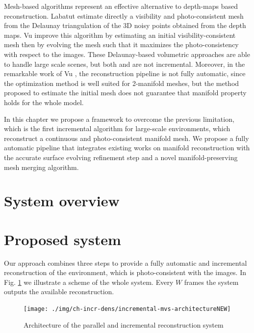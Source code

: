 Mesh-based algorithms represent an effective alternative to depth-maps based reconstruction. Labatut \etal \cite{labatut2007efficient} estimate directly a visibility and photo-consistent mesh from the Delaunay triangulation of the 3D noisy points obtained from the depth maps.
Vu \etal  \cite{vu_et_al_2012} improve this algorithm by estimating an initial visibility-consistent mesh then by evolving the mesh such that it maximizes the photo-consistency with respect to the images. 
These Delaunay-based volumetric approaches are able to handle large scale scenes, but both \cite{labatut2007efficient} and \cite{vu_et_al_2012}  are not incremental.
Moreover, in the remarkable work of Vu \etal \cite{vu_et_al_2012}, the reconstruction pipeline   is not fully automatic, since the optimization method is well suited for 2-manifold meshes, but the method proposed to estimate the initial mesh does not guarantee that manifold property holds for the whole model.



In this chapter we propose a framework to overcome the previous limitation, which is the first incremental algorithm for large-scale environments, which reconstruct a continuous and photo-consistent manifold mesh. 
We propose a fully automatic pipeline that integrates existing works on manifold reconstruction with the accurate surface evolving refinement step and a novel manifold-preserving mesh merging algorithm.


\section{System overview}
 
\section{Proposed system}
 Our approach combines three steps  to provide a fully automatic and incremental reconstruction of the environment, which is photo-consistent with the images. In Fig. \ref{fig:architecture} we illustrate a scheme of the whole system. Every  $W$ frames the system outputs the available reconstruction.
 
 \begin{figure}[t]
  \centering
  \texttt{[image: ./img/ch-incr-dens/incremental-mvs-architectureNEW]}
  \caption{Architecture of the parallel and incremental reconstruction system}
  \label{fig:architecture}
\end{figure}


